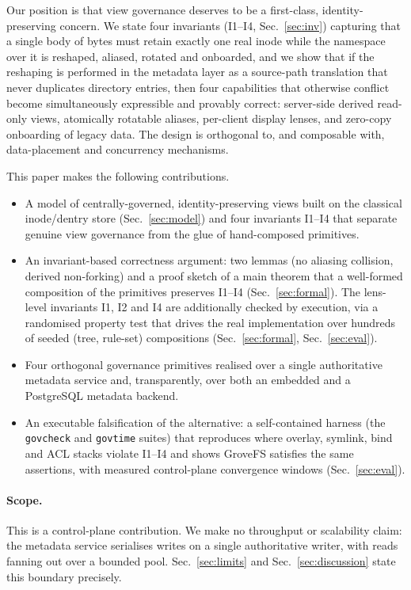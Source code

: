 \documentclass[numberedsection,acmtos]{acmart}
\begin{document}
Our position is that view governance deserves to be a first-class,
identity-preserving concern. We state four invariants (I1--I4,
Sec.~\ref{sec:inv}) capturing that a single body of bytes must retain exactly
one real inode while the namespace over it is reshaped, aliased, rotated and
onboarded, and we show that if the reshaping is performed in the metadata layer
as a source-path translation that never duplicates directory entries, then four
capabilities that otherwise conflict become simultaneously expressible and
provably correct: server-side derived read-only views, atomically rotatable
aliases, per-client display lenses, and zero-copy onboarding of legacy data.
The design is orthogonal to, and composable with, data-placement and
concurrency mechanisms.

This paper makes the following contributions.
\begin{itemize}
  \item A model of centrally-governed, identity-preserving views built on
        the classical inode/dentry store (Sec.~\ref{sec:model}) and four
        invariants I1--I4 that
        separate genuine view governance from the glue of hand-composed
        primitives.
  \item An invariant-based correctness argument: two lemmas (no
        aliasing collision, derived non-forking) and a proof sketch of a
        main theorem that a well-formed composition of the
        primitives preserves I1--I4 (Sec.~\ref{sec:formal}). The lens-level
        invariants I1, I2 and I4 are additionally checked by execution, via a
        randomised property test that drives the real implementation over
        hundreds of seeded (tree, rule-set) compositions (Sec.~\ref{sec:formal},
        Sec.~\ref{sec:eval}).
  \item Four orthogonal governance primitives realised over a single
        authoritative metadata service and, transparently, over both an
        embedded and a PostgreSQL metadata backend.
  \item An executable falsification of the alternative: a self-contained
        harness (the \texttt{govcheck} and \texttt{govtime} suites) that
        reproduces where overlay, symlink, bind and ACL stacks violate I1--I4
        and shows GroveFS satisfies the same assertions, with measured
        control-plane convergence windows (Sec.~\ref{sec:eval}).
\end{itemize}

\paragraph{Scope.}
This is a control-plane contribution. We make no throughput or scalability
claim: the metadata service serialises writes on a single authoritative writer,
with reads fanning out over a bounded pool. Sec.~\ref{sec:limits} and
Sec.~\ref{sec:discussion} state this boundary precisely.
\end{document}
